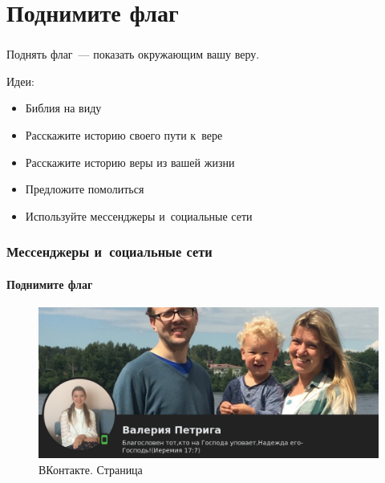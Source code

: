 \documentclass[t,aspectratio=169,14pt]{beamer}  %
\begin{document}
\section{Поднимите флаг}
\begin{frame}[c]
	\frametitle{\insertsection}
	\begin{block}{}
		Поднять флаг~--- показать окружающим вашу веру.
	\end{block}	
	Идеи:
	\begin{itemize}
		\item Библия на виду
		\item Расскажите историю своего пути к~вере
		\item Расскажите историю веры из вашей жизни
		\item Предложите помолиться
		\item Используйте мессенджеры и~социальные сети
	\end{itemize}
\end{frame}
\begin{frame}[c]
	\frametitle{Мессенджеры и~социальные сети}
	\framesubtitle{Поднимите флаг}
	\begin{figure}[h]
		\includegraphics[height=0.63\textheight]{vk.png}
		\caption{ВКонтакте. Страница}
		\end{figure}
\end{frame}
\end{document}
